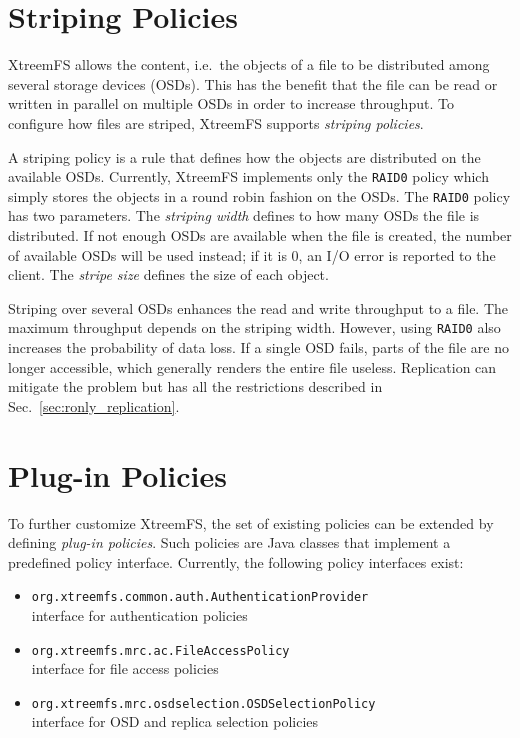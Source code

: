 \documentclass[a4paper,10pt]{book}
\begin{document}
\section{Striping Policies} \label{sec:striping_policies}

XtreemFS allows the content, i.e.\ the objects of a file to be distributed among several storage devices (OSDs). This has the benefit that the file can be read or written in parallel on multiple OSDs in order to increase throughput. To configure how files are striped, XtreemFS supports \emph{striping policies}.

A striping policy is a rule that defines how the objects are distributed on the available OSDs. Currently, XtreemFS implements only the \texttt{RAID0} policy which simply stores the objects in a round robin fashion on the OSDs. The \texttt{RAID0} policy has two parameters. The \emph{striping width} defines to how many OSDs the file is distributed. If not enough OSDs are available when the file is created, the number of available OSDs will be used instead; if it is 0, an I/O error is reported to the client. The \emph{stripe size} defines the size of each object.

Striping over several OSDs enhances the read and write throughput to a file. The maximum throughput depends on the striping width. However, using \texttt{RAID0} also increases the probability of data loss. If a single OSD fails, parts of the file are no longer accessible, which generally renders the entire file useless. Replication can mitigate the problem but has all the restrictions described in Sec.\ \ref{sec:ronly_replication}.


\section{Plug-in Policies}

To further customize XtreemFS, the set of existing policies can be extended by defining \textit{plug-in policies}. Such policies are Java classes that implement a predefined policy interface. Currently, the following policy interfaces exist:

\begin{itemize}
 \item \texttt{org.xtreemfs.common.auth.AuthenticationProvider}\\
   interface for authentication policies
 \item \texttt{org.xtreemfs.mrc.ac.FileAccessPolicy}\\
   interface for file access policies
 \item \texttt{org.xtreemfs.mrc.osdselection.OSDSelectionPolicy}\\
   interface for OSD and replica selection policies
\end{itemize}
\end{document}
